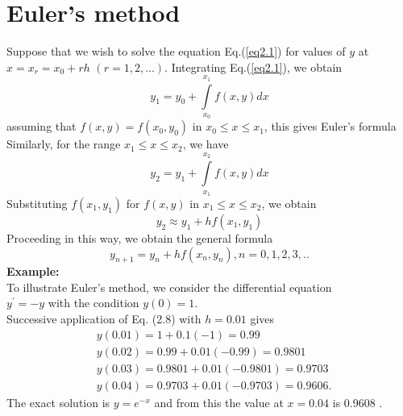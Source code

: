 \documentclass[12pt,a4paper,oneside]{book}
\begin{document}
\section{Euler's method}
Suppose that we wish to solve the equation Eq.(\ref{eq2.1}) for values of $y$ at $x=x_r=x_0+rh $ $(r=1,2,...)$. Integrating Eq.(\ref{eq2.1}), we obtain
\begin{equation}\label{b}
	y_{1}=y_0 + \int\limits_{x_0}^{x_1} f(x,y) dx
\end{equation}
assuming that $f(x,y)=f(x_0,y_0)$ in $x_0\leq x\leq x_1$, this gives Euler's formula
Similarly, for the range $x_1\leq x\leq x_2$, we have
\begin{equation}
	y_{2}=y_1 + \int\limits_{x_1}^{x_2}f(x,y) dx
\end{equation}
Substituting $f(x_1,y_1)$ for $f(x,y)$ in $x_1\leq x\leq x_2$, we obtain 
\begin{equation}
	y_2\approx y_1+hf(x_1,y_1)
\end{equation}
Proceeding in this way, we obtain the general formula
\begin{equation}
	y_{n+1}= y_n+hf(x_n,y_n), n=0,1,2,3,..
\end{equation}
\textbf{Example:}\\
\vspace{.3cm}To illustrate Euler's method, we consider the differential equation \\$y^{\prime}=-y$ with the condition $y(0)=1$. \\Successive application of Eq. (2.8) with $h=0.01$ gives $$ \begin{aligned} & y(0.01)=1+0.1(-1)=0.99 \\ & y(0.02)=0.99+0.01(-0.99)=0.9801 \\ & y(0.03)=0.9801+0.01(-0.9801)=0.9703 \\ & y(0.04)=0.9703+0.01(-0.9703)=0.9606 . \end{aligned} $$ The exact solution is $y=e^{-x}$ and from this the value at $x=0.04$ is 0.9608 .
\end{document}
